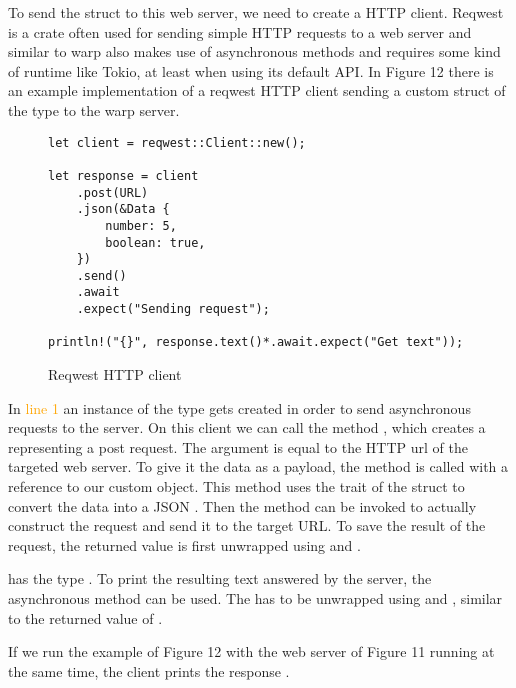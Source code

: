 To send the struct to this web server, we need to create a HTTP client. Reqwest is a crate often used for sending
simple HTTP requests to a web server and similar to warp also makes use of asynchronous methods and requires some kind
of runtime like Tokio, at least when using its default API. In Figure 12 there is an example implementation of a
reqwest HTTP client sending a custom struct of the type  to the warp server.

\begin{figure}[ht]
    \begin{verbatim}
let client = reqwest::Client::new();

let response = client
    .post(URL)
    .json(&Data {
        number: 5,
        boolean: true,
    })
    .send()
    .await
    .expect("Sending request");

println!("{}", response.text()*.await.expect("Get text"));
    \end{verbatim}
    \caption{Reqwest HTTP client}
\end{figure}

In \textcolor{orange}{line 1} an instance of the type  gets created in order to send asynchronous
requests to the server. On this client we can call the method , which creates a
 representing a post request. The argument  is equal to the HTTP url of the
targeted web server. To give it the data as a payload, the method  is called with a reference to our custom
 object. This method uses the  trait of the struct to convert the data into a JSON
. Then the  method can be invoked to actually construct the request and send it to the target
URL. To save the result of the request, the returned value is first unwrapped using  and .

 has the type . To print the resulting text answered by the server, the
asynchronous method  can be used. The  has to be unwrapped using  and
, similar to the returned value of .

If we run the example of Figure 12 with the web server of Figure 11 running at the same time, the client prints the
response  .
